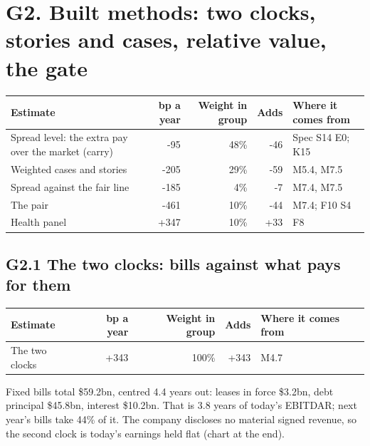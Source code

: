 \documentclass[11pt,a4paper]{article}
\begin{document}
\section*{G2. Built methods: two clocks, stories and cases, relative value, the gate}
\par\noindent{}
\begin{center}\footnotesize\setlength{\tabcolsep}{3.5pt}\begin{tabular}{@{}p{6.2cm}rrrp{4.2cm}@{}}\toprule
Estimate & bp a year & Weight in group & Adds & Where it comes from \\\midrule
Spread level: the extra pay over the market (carry) & -95 & 48\% & -46 & Spec S14 E0; K15 \\
Weighted cases and stories & -205 & 29\% & -59 & M5.4, M7.5 \\
Spread against the fair line & -185 & 4\% & -7 & M7.4, M7.5 \\
The pair & -461 & 10\% & -44 & M7.4; F10 S4 \\
Health panel & +347 & 10\% & +33 & F8 \\
\bottomrule\end{tabular}\end{center}
\subsection*{G2.1 The two clocks: bills against what pays for them}
\par\noindent{}
\begin{center}\footnotesize\setlength{\tabcolsep}{3.5pt}\begin{tabular}{@{}p{6.2cm}rrrp{4.2cm}@{}}\toprule
Estimate & bp a year & Weight in group & Adds & Where it comes from \\\midrule
The two clocks & +343 & 100\% & +343 & M4.7 \\
\bottomrule\end{tabular}\end{center}
Fixed bills total \$59.2bn, centred 4.4 years out: leases in force \$3.2bn, debt principal \$45.8bn, interest \$10.2bn. That is 3.8 years of today's EBITDAR; next year's bills take 44\% of it.
The company discloses no material signed revenue, so the second clock is today's earnings held flat (chart at the end).
\end{document}
